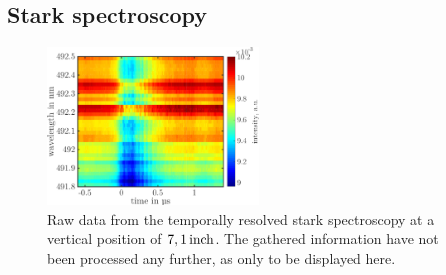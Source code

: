 \documentclass[a4paper,10pt]{article}
\begin{document}
			\begin{multicols}{2}
				
			\end{multicols}
			
			\twocolumn
		
		\subsection{Stark spectroscopy}
		
				\begin{figure}[h]
					\centering
					\includegraphics[width=0.5\textwidth]{figures/stark/stark_71inraw.pdf}
					\caption{Raw data from the temporally resolved stark spectroscopy at a vertical position of $\unit[7,1]{inch}$. The gathered information have not been processed any further, as only to be displayed here.}
				\end{figure}
\end{document}
